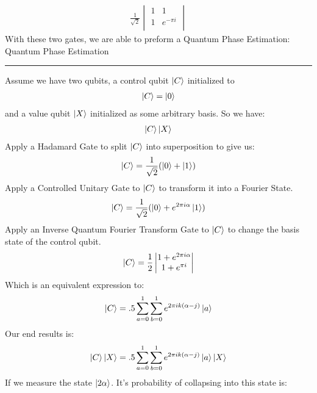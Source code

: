 \documentclass[conference]{IEEEtran}
\begin{document}
\begin{align*}
\frac{1}{\sqrt{2}}
    \begin{vmatrix}
    1 & 1 \\
    1 & e^{-\pi i} \\
    \end{vmatrix} 
\end{align*} 
\indent With these two gates, we are able to preform a Quantum Phase Estimation:\newline
\newline
{\large Quantum Phase Estimation} \newline
\noindent\rule{\columnwidth}{1pt}
Assume we have two qubits, a control qubit $\ket{C}$ initialized to
\begin{align*}
\ket{C} = \ket{0}
\end{align*} 
and a value qubit $\ket{X}$ initialized as some arbitrary basis. So we have: 
\begin{align*}
\ket{C} \ket{X}
\end{align*} 
\newline 
Apply a Hadamard Gate to split $\ket{C}$ into superposition to give us:
\begin{align*}
    \ket{C} = \frac{1}{\sqrt{2}}(\ket{0}+ \ket{1}) 
\end{align*}
Apply a Controlled Unitary Gate to $\ket{C}$ to transform it into a Fourier State. 
\begin{align*}
    \ket{C} = \frac{1}{\sqrt{2}}(\ket{0}+ e^{2 \pi i \alpha}\ket{1}) 
\end{align*}
Apply an Inverse Quantum Fourier Transform Gate to $\ket{C}$ to change the basis state of the control qubit.
\begin{align*}
    \ket{C} = \frac{1}{2}     \begin{vmatrix}
    1 + e^{2 \pi i \alpha} \\
    1 + e^{\pi i} \\
    \end{vmatrix} 
\end{align*}
Which is an equivalent expression to: 
\begin{align*}
    \ket{C} = .5 \sum_{a = 0}^1 \sum_{b = 0}^1 e^{2\pi i k(\alpha - j)}\ket{a}
\end{align*}
Our end results is: 
\begin{align*}
\ket{C} \ket{X} = .5 \sum_{a = 0}^1 \sum_{b = 0}^1 e^{2\pi i k(\alpha - j)}\ket{a} \ket{X}
\end{align*} 
If we measure the state $\ket{2 \alpha}$. It's probability of collapsing into this state is: 
\end{document}
